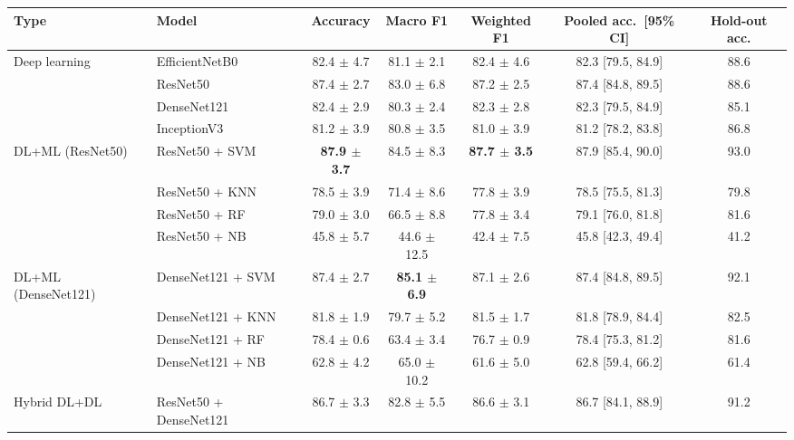 \begin{tabular}{llccccc}
\toprule
Type & Model & Accuracy & Macro F1 & Weighted F1 & Pooled acc.\ [95\% CI] & Hold-out acc. \\
\midrule
Deep learning & EfficientNetB0 & 82.4 $\pm$ 4.7 & 81.1 $\pm$ 2.1 & 82.4 $\pm$ 4.6 & 82.3 [79.5, 84.9] & 88.6 \\
 & ResNet50 & 87.4 $\pm$ 2.7 & 83.0 $\pm$ 6.8 & 87.2 $\pm$ 2.5 & 87.4 [84.8, 89.5] & 88.6 \\
 & DenseNet121 & 82.4 $\pm$ 2.9 & 80.3 $\pm$ 2.4 & 82.3 $\pm$ 2.8 & 82.3 [79.5, 84.9] & 85.1 \\
 & InceptionV3 & 81.2 $\pm$ 3.9 & 80.8 $\pm$ 3.5 & 81.0 $\pm$ 3.9 & 81.2 [78.2, 83.8] & 86.8 \\
\midrule
DL+ML (ResNet50) & ResNet50 + SVM & \textbf{87.9 $\pm$ 3.7} & 84.5 $\pm$ 8.3 & \textbf{87.7 $\pm$ 3.5} & 87.9 [85.4, 90.0] & 93.0 \\
 & ResNet50 + KNN & 78.5 $\pm$ 3.9 & 71.4 $\pm$ 8.6 & 77.8 $\pm$ 3.9 & 78.5 [75.5, 81.3] & 79.8 \\
 & ResNet50 + RF & 79.0 $\pm$ 3.0 & 66.5 $\pm$ 8.8 & 77.8 $\pm$ 3.4 & 79.1 [76.0, 81.8] & 81.6 \\
 & ResNet50 + NB & 45.8 $\pm$ 5.7 & 44.6 $\pm$ 12.5 & 42.4 $\pm$ 7.5 & 45.8 [42.3, 49.4] & 41.2 \\
\midrule
DL+ML (DenseNet121) & DenseNet121 + SVM & 87.4 $\pm$ 2.7 & \textbf{85.1 $\pm$ 6.9} & 87.1 $\pm$ 2.6 & 87.4 [84.8, 89.5] & 92.1 \\
 & DenseNet121 + KNN & 81.8 $\pm$ 1.9 & 79.7 $\pm$ 5.2 & 81.5 $\pm$ 1.7 & 81.8 [78.9, 84.4] & 82.5 \\
 & DenseNet121 + RF & 78.4 $\pm$ 0.6 & 63.4 $\pm$ 3.4 & 76.7 $\pm$ 0.9 & 78.4 [75.3, 81.2] & 81.6 \\
 & DenseNet121 + NB & 62.8 $\pm$ 4.2 & 65.0 $\pm$ 10.2 & 61.6 $\pm$ 5.0 & 62.8 [59.4, 66.2] & 61.4 \\
\midrule
Hybrid DL+DL & ResNet50 + DenseNet121 & 86.7 $\pm$ 3.3 & 82.8 $\pm$ 5.5 & 86.6 $\pm$ 3.1 & 86.7 [84.1, 88.9] & 91.2 \\
\bottomrule
\end{tabular}
